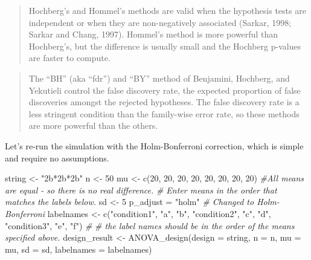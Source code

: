 \documentclass[
]{book}
\newenvironment{Shaded}{\begin{snugshade}}{\end{snugshade}}
\newcommand{\AttributeTok}[1]{\textcolor[rgb]{0.77,0.63,0.00}{#1}}
\newcommand{\CommentTok}[1]{\textcolor[rgb]{0.56,0.35,0.01}{\textit{#1}}}
\newcommand{\DecValTok}[1]{\textcolor[rgb]{0.00,0.00,0.81}{#1}}
\newcommand{\FunctionTok}[1]{\textcolor[rgb]{0.00,0.00,0.00}{#1}}
\newcommand{\NormalTok}[1]{#1}
\newcommand{\OtherTok}[1]{\textcolor[rgb]{0.56,0.35,0.01}{#1}}
\newcommand{\StringTok}[1]{\textcolor[rgb]{0.31,0.60,0.02}{#1}}
\begin{document}
\begin{quote}
Hochberg's and Hommel's methods are valid when the hypothesis tests are independent or when they are non-negatively associated (Sarkar, 1998; Sarkar and Chang, 1997). Hommel's method is more powerful than Hochberg's, but the difference is usually small and the Hochberg p-values are faster to compute.
\end{quote}

\begin{quote}
The ``BH'' (aka ``fdr'') and ``BY'' method of Benjamini, Hochberg, and Yekutieli control the false discovery rate, the expected proportion of false discoveries amongst the rejected hypotheses. The false discovery rate is a less stringent condition than the family-wise error rate, so these methods are more powerful than the others.
\end{quote}

Let's re-run the simulation with the Holm-Bonferroni correction, which is simple and require no assumptions.

\begin{Shaded}
\begin{Highlighting}[]
\NormalTok{string }\OtherTok{\textless{}{-}} \StringTok{"2b*2b*2b"}
\NormalTok{n }\OtherTok{\textless{}{-}} \DecValTok{50}
\NormalTok{mu }\OtherTok{\textless{}{-}} \FunctionTok{c}\NormalTok{(}\DecValTok{20}\NormalTok{, }\DecValTok{20}\NormalTok{, }\DecValTok{20}\NormalTok{, }\DecValTok{20}\NormalTok{, }\DecValTok{20}\NormalTok{, }\DecValTok{20}\NormalTok{, }\DecValTok{20}\NormalTok{, }\DecValTok{20}\NormalTok{) }
\CommentTok{\#All means are equal {-} so there is no real difference.}
\CommentTok{\# Enter means in the order that matches the labels below.}
\NormalTok{sd }\OtherTok{\textless{}{-}} \DecValTok{5}
\NormalTok{p\_adjust }\OtherTok{=} \StringTok{"holm"}
\CommentTok{\# Changed to Holm{-}Bonferroni}
\NormalTok{labelnames }\OtherTok{\textless{}{-}} \FunctionTok{c}\NormalTok{(}\StringTok{"condition1"}\NormalTok{, }\StringTok{"a"}\NormalTok{, }\StringTok{"b"}\NormalTok{, }
                \StringTok{"condition2"}\NormalTok{, }\StringTok{"c"}\NormalTok{, }\StringTok{"d"}\NormalTok{, }
                \StringTok{"condition3"}\NormalTok{, }\StringTok{"e"}\NormalTok{, }\StringTok{"f"}\NormalTok{) }\CommentTok{\#}
\CommentTok{\# the label names should be in the order of the means specified above.}
\NormalTok{design\_result }\OtherTok{\textless{}{-}} \FunctionTok{ANOVA\_design}\NormalTok{(}\AttributeTok{design =}\NormalTok{ string,}
                   \AttributeTok{n =}\NormalTok{ n, }
                   \AttributeTok{mu =}\NormalTok{ mu, }
                   \AttributeTok{sd =}\NormalTok{ sd, }
                   \AttributeTok{labelnames =}\NormalTok{ labelnames)}
\end{Highlighting}
\end{Shaded}
\end{document}
